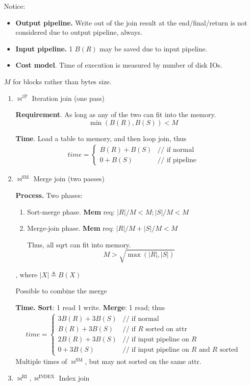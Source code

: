 \documentclass[a4paper]{report}
\begin{document}
Notice:
\begin{itemize}
\item \textbf{Output pipeline.} Write out of the join result at the end/final/return is not considered due to output pipeline, always.
\item \textbf{Input pipeline.} 1 $B(R)$ may be saved due to input pipeline.
\item \textbf{Cost model}. Time of execution is measured by number of disk IOs.
\end{itemize}

$M$ for blocks rather than bytes size.

\begin{enumerate}
\item $\bowtie^{\text{1P}}$ Iteration join (one pass)

\textbf{Requirement}. As long as any of the two can fit into the memory.
$$
\min(B(R), B(S)) < M
$$

\textbf{Time}. Load a table to memory, and then loop join, thus
\begin{eqnarray*}
time = \left\{ \begin{array}{rl}
  B(R)+B(S) &\text{// if normal }\\
  0+B(S) &\text{// if pipeline}
       \end{array} \right.
\end{eqnarray*}
\item $\bowtie^\text{SM}$ Merge join (two passes)

\textbf{Process.} Two phases:
\begin{enumerate}
\item Sort-merge phase. \textbf{Mem} req: $|R|/M<M; |S|/M<M $
\item Merge-join phase. \textbf{Mem} req: $|R|/M+|S|/M <M$

Thus, all sqrt can fit into memory.
$$
M>\sqrt{\max{(|R|,|S|)}}
$$
\end{enumerate}

, where $|X|\triangleq B(X)$

Possible to combine the merge

\textbf{Time.} \textbf{Sort}: 1 read 1 write. \textbf{Merge}: 1 read; thus
\begin{eqnarray*}
time = \left\{ \begin{array}{rl}
  3B(R)+3B(S) &\text{// if normal} \\
  B(R)+3B(S) &\text{// if $R$ sorted on attr} \\
  2B(R)+3B(S) &\text{// if input pipeline on $R$}\\
  0+3B(S) &\text{// if input pipeline on $R$ and $R$ sorted}
       \end{array} \right.
\end{eqnarray*}
Multiple times of $\bowtie^\text{SM}$, but may not sorted on the same attr.
\item $\bowtie^\text{RI}, \bowtie^\text{INDEX}$ Index join


\end{enumerate}
\end{document}
